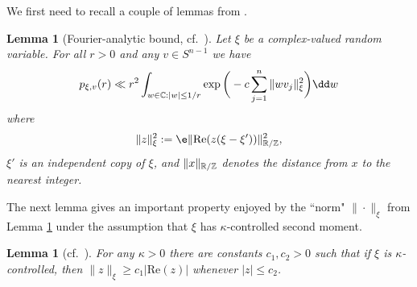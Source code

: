 \documentclass[aop,preprint]{imsart}
\theoremstyle{plain}
\newtheorem{lemma}[theorem]{Lemma}
\theoremstyle{definition}
\theoremstyle{remark}
\numberwithin{equation}{section}
\numberwithin{theorem}{section}
\def \re {\mathrm{Re}}
\begin{document}


We first need to recall a couple of lemmas from \citep{TaVu:smooth, TaVu:circ}.

\begin{lemma}[Fourier-analytic bound, cf.\ {\cite[Lemma 6.1]{TaVu:smooth}}]	\label{lem:fourier}
Let $\xi$ be a complex-valued random variable.
For all $r> 0$ and any $v\in S^{n-1}$ we have
\begin{equation}
p_{\xi,v}(r) \ll r^2\int_{w\in \C: |w|\le 1/r} \exp\bigg( -c\sum_{j=1}^n \|wv_j\|_\xi^2\bigg) \dd w
\end{equation}
where 
\begin{equation}
\|z\|_\xi^2:= \e \|\re(z(\xi-\xi'))\|_{\R/\Z}^2,
\end{equation}
$\xi'$ is an independent copy of $\xi$, and $\|x\|_{{\mathbb R}/{\mathbb Z}}$ denotes the distance from $x$ to the nearest integer. 
\end{lemma}

The next lemma gives an important property enjoyed by the ``norm" $\|\cdot\|_\xi$ from Lemma \ref{lem:fourier} under the assumption that $\xi$ has $\kappa$-controlled second moment.

\begin{lemma}[cf.\ {\cite[Lemma 5.3]{TaVu:circ}}]	\label{lem:modbound}
For any $\kappa>0$ there are constants $c_1,c_2>0$ such that if $\xi$ is $\kappa$-controlled, then $\|z\|_\xi \ge c_1|\re(z)|$ whenever $|z|\le c_2$.
\end{lemma}
\end{document}
